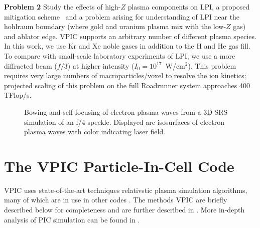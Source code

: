 \documentclass[10pt]{article}
\begin{document}
\textbf{Problem 2}
Study the effects of high-$Z$ plasma components on LPI, a proposed
mitigation scheme~\cite{Lushnikov_PPCF_2006} and a problem arising for
understanding of LPI near the hohlraum boundary (where gold and
uranium plasma mix with the low-$Z$ gas) and ablator edge.  VPIC
supports an arbitrary number of different plasma species.  In this
work, we use Kr and Xe noble gases in addition to the H and He gas
fill.  To compare with small-scale laboratory experiments of LPI, we
use a more diffracted beam ($f/3$) at higher intensity ($I_0 =
10^{17}$~W/cm$^2$). This problem requires very large numbers of
macroparticles/voxel to resolve the ion kinetics; projected scaling of
this problem on the full Roadrunner system approaches 400 TFlop/s.




\begin{figure}
    \begin{center}
    \caption{Bowing and self-focusing of electron plasma waves from 
		a 3D SRS simulation of an f/4 speckle. Displayed are 
		isosurfaces of electron plasma waves with color 
		indicating laser field.}
    \label{fig:lpi}
    \end{center}
\end{figure}


\section{The VPIC Particle-In-Cell Code}

VPIC uses state-of-the-art techniques relativstic plasma simulation
algorithms, many of which are in use in other codes
\cite{Blahovec_et_al_2000,Eastwood_et_al_1995,Jones_et_al_1996,Kwan_Snell_1985,Nieter_Cary_2004,Verboncoeur_et_al_1995}.
The methods VPIC are briefly described below for completeness and are
further described in \cite{Bowers_et_al_Phys_Plasmas_2007}.  More
in-depth analysis of PIC simulation can be found in
\cite{Birdsall_Langdon_1985,Hockney_Eastwood_1988}.
\end{document}
